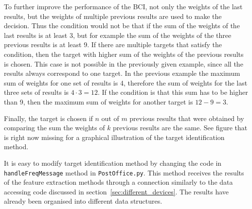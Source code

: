To further improve the performance of the \gls{BCI}, not only the weights of the last results, but the weights of multiple previous results are used to make the decision. Thus the condition would not be that if the sum of the weights of the last results is at least 3, but for example the sum of the weights of the three previous results is at least 9. If there are multiple \glspl{target} that satisfy the condition, then the \gls{target} with higher sum of the weights of the previous results is chosen. This case is not possible in the previously given example, since all the results always correspond to one \gls{target}. In the previous example the maximum sum of weights for one set of results is 4, therefore the sum of weights for the last three sets of results is $4\cdot 3=12$. If the condition is that this sum has to be higher than 9, then the maximum sum of weights for another \gls{target} is $12-9=3$.

Finally, the \gls{target} is chosen if $n$ out of $m$ previous results that were obtained by comparing the sum the weights of $k$ previous results are the same. See figure that is right now missing for a graphical illustration of the \gls{target} identification method.



It is easy to modify \gls{target} identification method by changing the code in \texttt{handleFreqMessage} method in \texttt{PostOffice.py}. This method receives the results of the \gls{feature extraction} methods through a connection similarly to the data accessing code discussed in section~\ref{sec:different_devices}. The results have already been organised into different data structures. %

